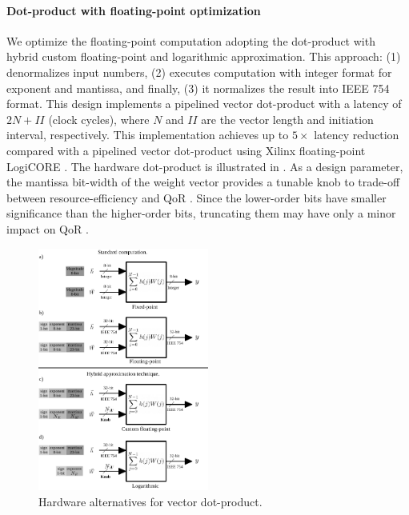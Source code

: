 \paragraph{\textbf{Dot-product with floating-point optimization}}
\label{sec:dot_product}
We optimize the floating-point computation adopting the dot-product with hybrid custom floating-point and logarithmic approximation\cite{nevarez2021accelerating}. This approach: (1) denormalizes input numbers, (2) executes computation with integer format for exponent and mantissa, and finally, (3) it normalizes the result into IEEE 754 format. This design implements a pipelined vector dot-product with a latency of $2N+II$ (clock cycles), where $N$ and $II$ are the vector length and initiation interval, respectively. This implementation achieves up to $5\times$ latency reduction compared with a pipelined vector dot-product using Xilinx floating-point LogiCORE \cite{nevarez2021accelerating}. The hardware dot-product is illustrated in . As a design parameter, the mantissa bit-width of the weight vector provides a tunable knob to trade-off between resource-efficiency and QoR \cite{park2009dynamic}. Since the lower-order bits have smaller significance than the higher-order bits, truncating them may
have only a minor impact on QoR \cite{mittal2016survey}.

\begin{figure}[t!]
	\centering
	\includegraphics[width=0.5\textwidth]{../figures/dot-product_unit.pdf}
	\caption{Hardware alternatives for vector dot-product.}
	\label{fig:dot_product}
\end{figure}


